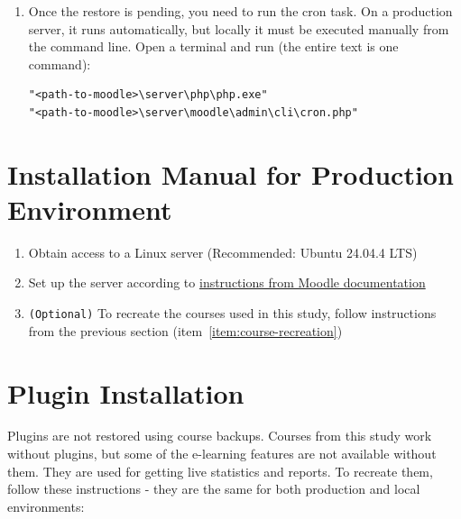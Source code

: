 \begin{enumerate}
\begin{enumerate}
\begin{figure}[H]
\caption{Restore a backup as a new course}
\label{fig:restore-course-as-new-course}
\end{figure}
            \item Once the restore is pending, you need to run the cron task. On a production server, it runs automatically, but locally it must be executed manually from the command line. Open a terminal and run (the entire text is one command):
\begin{verbatim}
"<path-to-moodle>\server\php\php.exe"
"<path-to-moodle>\server\moodle\admin\cli\cron.php"
\end{verbatim}
        \end{enumerate}
\end{enumerate}


\section{Installation Manual for Production Environment}

\begin{enumerate}
    \item Obtain access to a Linux server (Recommended: Ubuntu 24.04.4 LTS)
    \item Set up the server according to \href{https://docs.moodle.org/500/en/}{\color{blue}instructions from Moodle documentation}
    \item \texttt{(Optional)} To recreate the courses used in this study, follow instructions from the previous section (item~\ref{item:course-recreation})
\end{enumerate}


\section{Plugin Installation} \label{sec:plugin-installation}

Plugins are not restored using course backups. Courses from this study work without plugins, but some of the e-learning features are not available without them. They are used for getting live statistics and reports. To recreate them, follow these instructions - they are the same for both production and local environments:

